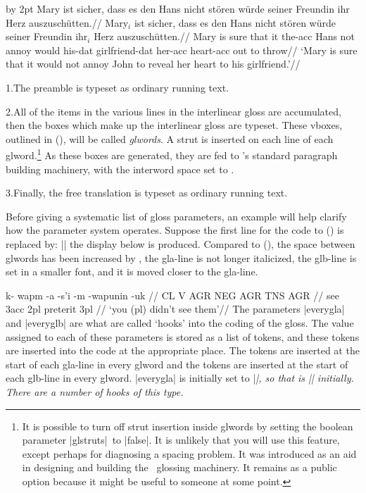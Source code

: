 \begingroup
\advance\hsize by 2pt
\framedisplay %
\boxglwords
\ex[glspace=1.2em,extraglskip=1ex,belowpreambleskip=2ex,aboveglftskip=2ex]
\begingl
\glpreamble Mary ist sicher, dass es den Hans nicht st\"oren w\"urde
seiner Freundin ihr Herz auszusch\"utten.//
\gla Mary$_i$ ist sicher, dass es den Hans nicht st\"oren w\"urde
seiner Freundin ihr$_i$ Herz auszusch\"utten.//
\glb Mary is sure that it the-{\sc acc} Hans not annoy would
his-{\sc dat} girlfriend-{\sc dat} her-{\sc acc} heart-{\sc acc} {out to
throw}//
\glft  `Mary is sure that it would not annoy John to reveal her
heart to his girlfriend.'//
\endgl
\xe
\endframedisplay
\endgroup

\smallskip
\item{1.}The preamble is typeset as ordinary running text.
\item{2.}All of the items in the various lines in the interlinear gloss are
accumulated, then the boxes which make up the interlinear gloss are
typeset.  These vboxes, outlined in (\lastx), will be called {\it
glwords}. A strut is inserted on each line of each glword.\footnote{It
is possible to turn off strut insertion inside glwords by setting the
boolean parameter |glstruts|\ to |false|.
It is unlikely that you will use this feature, except perhaps for
diagnosing a spacing problem.  It was introduced as an aid in
designing and building the \ExPex\ glossing machinery.  It remains
as a public option because it might be useful to someone at some
point.} As these boxes are generated, they are fed to \Tex's standard
paragraph building machinery, with the interword space set to
. \item{3.}Finally, the free translation is typeset
as ordinary running text.
\medskip

Before giving a systematic list of gloss parameters, an example
will help clarify how the parameter system operates.  Suppose the
first line for the code to () is replaced by:
\medskip
\noindent |\ex[glspace=!1em,everygla={},everyglb=\footnotesize,aboveglbskip=-.2ex]|
\medskip
\noindent the display below is produced.  Compared to
(), the space between glwords has been increased by
\textdim{1 em}, the gla-line is not longer italicized, the glb-line is
set in a smaller font, and it is moved closer to the gla-line.

\framedisplay
{}
\begingl
\gla k- wapm -a -s'i -m -wapunin -uk //
\glb CL V AGR NEG AGR TNS AGR //
 see {\sc 3acc} {} {\sc 2pl} preterit {\sc 3pl} //
\glft `you (pl) didn't see them'//
\endgl
\xe
\endframedisplay
The parameters |everygla| and |everyglb| are what are called `hooks'
into the coding of the gloss.  The value assigned to each of these
parameters is stored as a list of tokens, and these tokens are
inserted into the code at the appropriate place.  The tokens
 are inserted at the start of each gla-line in
every glword and the tokens  are inserted at the
start of each glb-line in every glword.  |everygla| is initially set
to |\it|, so that  is |{\it}| initially.  There are a
number of hooks of this type.

